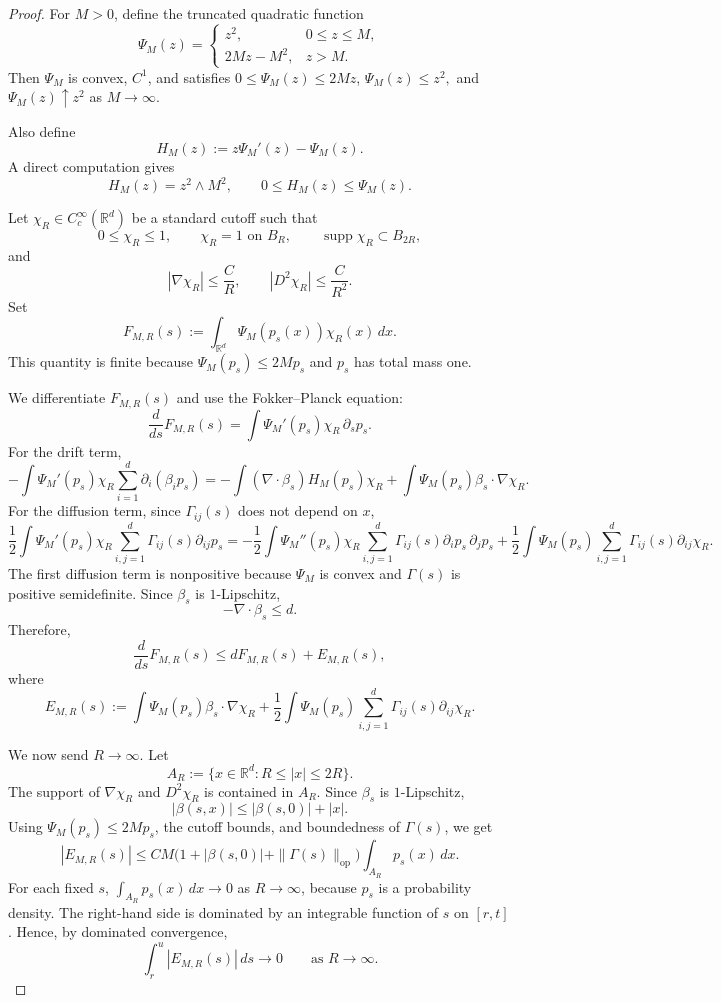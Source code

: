 \documentclass{article}
\newcommand{\1}{\mathbbm{1}}
\numberwithin{equation}{section}
\def\to{\rightarrow}
\begin{document}
\begin{proof}
For $M>0$, define the truncated quadratic function
\[
\Psi_M(z)
=
\begin{cases}
z^2, & 0\le z\le M,\\
2Mz-M^2, & z>M.
\end{cases}
\]
Then $\Psi_M$ is convex, $C^1$, and satisfies
$
0\le \Psi_M(z)\le 2Mz$,
$\Psi_M(z)\le z^2,
$
and $\Psi_M(z)\uparrow z^2$ as $M\to\infty$.


Also define
\[
H_M(z):=z\Psi_M'(z)-\Psi_M(z).
\]
A direct computation gives
\[
H_M(z)=z^2\wedge M^2,
\qquad
0\le H_M(z)\le \Psi_M(z).
\]

Let $\chi_R\in C_c^\infty(\mathbb R^d)$ be a standard cutoff such that
\[
0\le \chi_R\le 1,\qquad
\chi_R=1 \text{ on } B_R,\qquad
\operatorname{supp}\chi_R\subset B_{2R},
\]
and
\[
|\nabla \chi_R|\le \frac{C}{R},
\qquad
|D^2\chi_R|\le \frac{C}{R^2}.
\]
Set
\[
F_{M,R}(s):=\int_{\mathbb R^d}\Psi_M(p_s(x))\chi_R(x)\,dx.
\]
This quantity is finite because $\Psi_M(p_s)\le 2Mp_s$ and $p_s$ has total
mass one.

We differentiate $F_{M,R}(s)$ and use the Fokker--Planck equation:
\[
\frac{d}{ds}F_{M,R}(s)
=
\int \Psi_M'(p_s)\chi_R\,\partial_s p_s.
\]
For the drift term,
\[
-\int \Psi_M'(p_s)\chi_R
\sum_{i=1}^d \partial_i(\beta_i p_s)
=
-\int (\nabla\cdot \beta_s)H_M(p_s)\chi_R
+
\int \Psi_M(p_s)\beta_s\cdot\nabla\chi_R.
\]
For the diffusion term, since $\Gamma_{ij}(s)$ does not depend on $x$,
\[
\frac12
\int \Psi_M'(p_s)\chi_R
\sum_{i,j=1}^d \Gamma_{ij}(s)\partial_{ij}p_s
=
-\frac12
\int \Psi_M''(p_s)\chi_R
\sum_{i,j=1}^d \Gamma_{ij}(s)\partial_i p_s\,\partial_j p_s
+
\frac12
\int \Psi_M(p_s)
\sum_{i,j=1}^d \Gamma_{ij}(s)\partial_{ij}\chi_R.
\]
The first diffusion term is nonpositive because $\Psi_M$ is convex and
$\Gamma(s)$ is positive semidefinite. Since $\beta_s$ is $1$-Lipschitz,
\[
-\nabla\cdot\beta_s\le d.
\]
Therefore,
\[
\frac{d}{ds}F_{M,R}(s)
\le
dF_{M,R}(s)+E_{M,R}(s),
\]
where
\[
E_{M,R}(s)
:=
\int \Psi_M(p_s)\beta_s\cdot\nabla\chi_R
+
\frac12
\int \Psi_M(p_s)
\sum_{i,j=1}^d \Gamma_{ij}(s)\partial_{ij}\chi_R.
\]

We now send $R\to\infty$. Let
\[
A_R:=\{x\in\mathbb R^d:R\le |x|\le 2R\}.
\]
The support of $\nabla\chi_R$ and $D^2\chi_R$ is contained in $A_R$. Since
$\beta_s$ is $1$-Lipschitz,
\[
|\beta(s,x)|\le |\beta(s,0)|+|x|.
\]
Using $\Psi_M(p_s)\le 2Mp_s$, the cutoff bounds, and boundedness of $\Gamma(s)$,
we get
\[
|E_{M,R}(s)|
\le
C M\bigl(1+|\beta(s,0)|+\|\Gamma(s)\|_{\mathrm{op}}\bigr)
\int_{A_R}p_s(x)\,dx.
\]
For each fixed $s$, $\int_{A_R}p_s(x)\,dx\to0$ as $R\to\infty$, because
$p_s$ is a probability density. The right-hand side is dominated by an
integrable function of $s$ on $[r,t]$. Hence, by dominated convergence,
\[
\int_r^u |E_{M,R}(s)|\,ds\to0
\qquad\text{as }R\to\infty.
\]


\end{proof}
\end{document}
